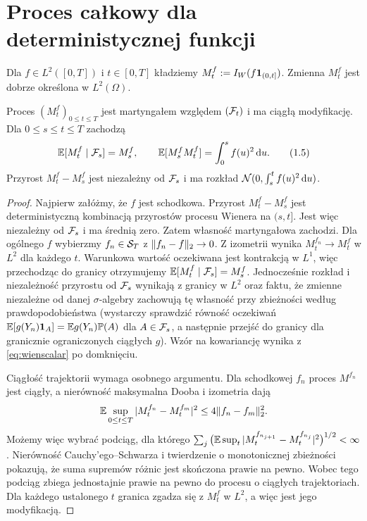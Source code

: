 \section{Proces całkowy dla deterministycznej funkcji}
\begin{definicja}
Dla $f\in L^2([0,T])$ i $t\in[0,T]$ kładziemy
$M_t^f:=I_W(f\mathbf{1}_{(0,t]})$.
Zmienna $M_t^f$ jest dobrze określona w $L^2(\Omega)$.
\end{definicja}
\begin{twierdzenie}
Proces $(M_t^f)_{0\le t\le T}$ jest martyngałem względem
$(\mathcal{F}_t)$ i ma ciągłą modyfikację. Dla $0\le s\le t\le T$
zachodzą
\[
\mathbb{E}[M_t^f\mid\mathcal{F}_s]=M_s^f,\qquad
\mathbb{E}[M_s^fM_t^f]=\int_0^sf(u)^2\,\mathrm{d} u.
\tag{1.5}
\]
Przyrost $M_t^f-M_s^f$ jest niezależny od $\mathcal{F}_s$
i ma rozkład $\mathcal{N}(0,\int_s^tf(u)^2\,\mathrm{d} u)$.
\end{twierdzenie}
\begin{proof}
Najpierw załóżmy, że $f$ jest schodkowa. Przyrost
$M_t^f-M_s^f$ jest deterministyczną kombinacją przyrostów
procesu Wienera na $(s,t]$. Jest więc niezależny od $\mathcal{F}_s$
i ma średnią zero. Zatem własność martyngałowa zachodzi.
Dla ogólnego $f$ wybierzmy $f_n\in\mathcal{S}_T$ z
$\lVert f_n-f\rVert_2\to0$. Z izometrii wynika
$M_t^{f_n}\to M_t^f$ w $L^2$ dla każdego $t$.
Warunkowa wartość oczekiwana jest kontrakcją w $L^1$,
więc przechodząc do granicy otrzymujemy
$\mathbb{E}[M_t^f\mid\mathcal{F}_s]=M_s^f$. Jednocześnie rozkład
i niezależność przyrostu od $\mathcal{F}_s$ wynikają z granicy
w $L^2$ oraz faktu, że zmienne niezależne od danej
$\sigma$-algebry zachowują tę własność przy zbieżności
według prawdopodobieństwa (wystarczy sprawdzić równość
oczekiwań $\mathbb{E}[g(Y_n)\mathbf{1}_{A}]=\mathbb{E} g(Y_n)\mathbb{P}(A)$ dla
$A\in\mathcal{F}_s$, a następnie przejść do granicy dla
granicznie ograniczonych ciągłych $g$). Wzór na kowariancję
wynika z \eqref{eq:wienscalar} po domknięciu.

Ciągłość trajektorii wymaga osobnego argumentu. Dla
schodkowej $f_n$ proces $M^{f_n}$ jest ciągły, a
nierówność maksymalna Dooba i izometria dają
\[
\mathbb{E}\sup_{0\le t\le T}|M_t^{f_n}-M_t^{f_m}|^2
\le4\lVert f_n-f_m\rVert_2^2.
\]
Możemy więc wybrać podciąg, dla którego
$\sum_j\big(\mathbb{E}\sup_t|M_t^{f_{n_{j+1}}}-M_t^{f_{n_j}}|^2\big)^{1/2}<\infty$.
Nierówność Cauchy'ego--Schwarza i twierdzenie o monotonicznej
zbieżności pokazują, że suma supremów różnic jest skończona
prawie na pewno. Wobec tego podciąg zbiega jednostajnie
prawie na pewno do procesu o ciągłych trajektoriach.
Dla każdego ustalonego $t$ granica zgadza się z $M_t^f$
w $L^2$, a więc jest jego modyfikacją.
\end{proof}

